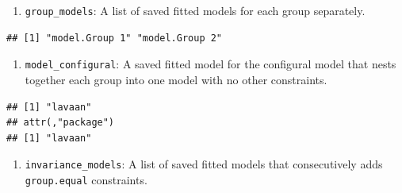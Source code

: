 \documentclass[
  man,floatsintext]{apa7}
\newenvironment{Shaded}{\begin{snugshade}}{\end{snugshade}}
\newcommand{\FunctionTok}[1]{\textcolor[rgb]{0.13,0.29,0.53}{\textbf{#1}}}
\newcommand{\NormalTok}[1]{#1}
\newcommand{\SpecialCharTok}[1]{\textcolor[rgb]{0.81,0.36,0.00}{\textbf{#1}}}
\providecommand{\tightlist}{%
  \setlength{\itemsep}{0pt}\setlength{\parskip}{0pt}}
\begin{document}
\begin{enumerate}
\def\labelenumi{\arabic{enumi})}
\setcounter{enumi}{3}
\tightlist
\item
  \texttt{group\_models}: A list of saved fitted models for each group separately.
\end{enumerate}

\small

\begin{Shaded}
\end{Shaded}

\normalsize

\begin{verbatim}
## [1] "model.Group 1" "model.Group 2"
\end{verbatim}

\begin{enumerate}
\def\labelenumi{\arabic{enumi})}
\setcounter{enumi}{4}
\tightlist
\item
  \texttt{model\_configural}: A saved fitted model for the configural model that nests together each group into one model with no other constraints.
\end{enumerate}

\small

\begin{Shaded}
\end{Shaded}

\normalsize

\begin{verbatim}
## [1] "lavaan"
## attr(,"package")
## [1] "lavaan"
\end{verbatim}

\begin{enumerate}
\def\labelenumi{\arabic{enumi})}
\setcounter{enumi}{5}
\tightlist
\item
  \texttt{invariance\_models}: A list of saved fitted models that consecutively adds \texttt{group.equal} constraints.
\end{enumerate}

\small

\begin{Shaded}
\end{Shaded}
\end{document}
